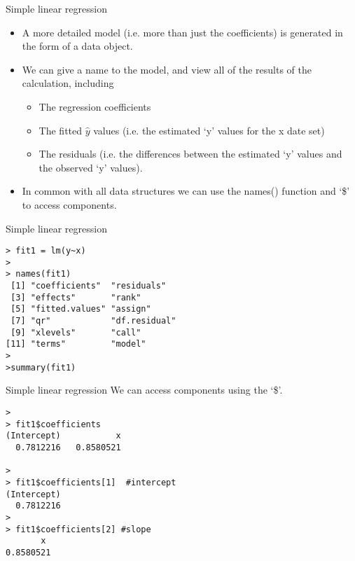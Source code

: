 \documentclass[pdf,default,slideColor,colorBG]{prosper}
\begin{document}
\begin{slide}{Simple linear regression}
\begin{itemize} \item A more detailed model (i.e. more than just the coefficients) is generated in the form of a data object. \item We can give a name to the model, and view all of the results of the calculation, including \begin {itemize} \item The regression coefficients \item
The fitted $\hat{y}$ values (i.e. the estimated `y' values for the x date set) \item The residuals (i.e. the differences between  the estimated `y' values and the observed `y' values). \end{itemize}\item
In common with all data structures we can use the names() function and `\$' to access components.\end{itemize}
\end{slide}

\begin{slide}{Simple linear regression}

\begin{verbatim}
> fit1 = lm(y~x)
>
> names(fit1)
 [1] "coefficients"  "residuals"
 [3] "effects"       "rank"
 [5] "fitted.values" "assign"
 [7] "qr"            "df.residual"
 [9] "xlevels"       "call"
[11] "terms"         "model"
>
>summary(fit1)
\end{verbatim}

\end{slide}


\begin{slide}{Simple linear regression}
We can access components using the `\$'.
\begin{verbatim}
>
> fit1$coefficients
(Intercept)           x
  0.7812216   0.8580521

>
> fit1$coefficients[1]  #intercept
(Intercept)
  0.7812216
>
> fit1$coefficients[2] #slope
       x
0.8580521
\end{verbatim}

\end{slide}
\end{document}

